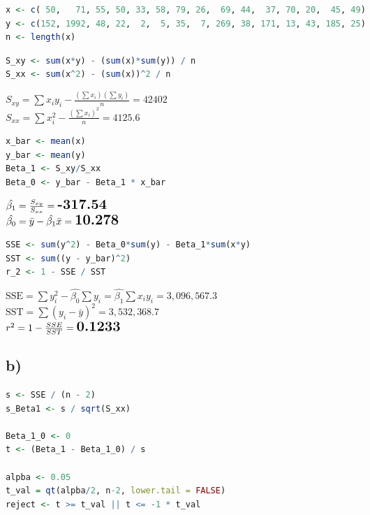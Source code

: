 \documentclass[a4paper,11pt]{article}
\begin{document}
\begin{lstlisting}[language=R]
x <- c( 50,   71, 55, 50, 33, 58, 79, 26,  69, 44,  37, 70, 20,  45, 49)
y <- c(152, 1992, 48, 22,  2,  5, 35,  7, 269, 38, 171, 13, 43, 185, 25)
n <- length(x)
\end{lstlisting}

\begin{lstlisting}[language=R]
S_xy <- sum(x*y) - (sum(x)*sum(y)) / n
S_xx <- sum(x^2) - (sum(x))^2 / n
\end{lstlisting}
\vspace{0.5cm}

$S_{xy} = \sum{x_i y_i} - \frac{\left(\sum{x_i}\right)\left(\sum{y_i}\right)}{n} = 42402$\\

$S_{xx} = \sum{x_i^2} - \frac{\left(\sum{x_i}\right)^2}{n} = 4125.6$ \\

\begin{lstlisting}[language=R]
x_bar <- mean(x)
y_bar <- mean(y)
Beta_1 <- S_xy/S_xx
Beta_0 <- y_bar - Beta_1 * x_bar
\end{lstlisting}
\vspace{0.5cm}

$\hat{\beta_1} = \frac{S_{xy}}{S_{xx}} = \Large{\textbf{-317.54}}$\\

$\hat{\beta_0} = \bar{y} - \hat{\beta_1}\bar{x} = \Large{\textbf{10.278}}$ \\


\begin{lstlisting}[language=R]
SSE <- sum(y^2) - Beta_0*sum(y) - Beta_1*sum(x*y)
SST <- sum((y - y_bar)^2)
r_2 <- 1 - SSE / SST
\end{lstlisting}
\vspace{0.5cm}

$\text{SSE} = \sum{y_i^2} - \hat{\beta_0}\sum{y_i} = \hat{\beta_1}\sum{x_i y_i} = 3,096,567.3$\\

$\text{SST} = \sum{\left(y_i - \bar{y}\right)^2} = 3,532,368.7$\\

$r^2 = 1 - \frac{SSE}{SST} = \textbf{\Large{0.1233}}$

\pagebreak
\subsection*{b)}

\begin{lstlisting}[language=R]
s <- SSE / (n - 2)
s_Beta1 <- s / sqrt(S_xx)

Beta_1_0 <- 0
t <- (Beta_1 - Beta_1_0) / s

alpba <- 0.05
t_val = qt(alpba/2, n-2, lower.tail = FALSE)
reject <- t >= t_val || t <= -1 * t_val  
\end{lstlisting}
\vspace{0.5cm}
\end{document}
